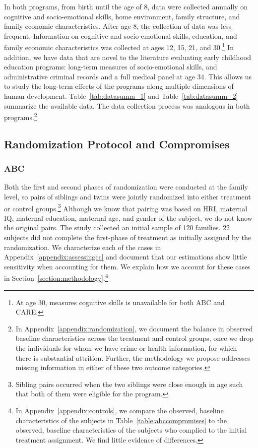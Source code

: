 \noindent In both programs, from birth until the age of 8, data were collected annually on cognitive and socio-emotional skills, home environment, family structure, and family economic characteristics. After age 8, the collection of data was less frequent. Information on cognitive and socio-emotional skills, education, and family economic characteristics was collected at ages 12, 15, 21, and 30.\footnote{At age 30, measures cognitive skills is unavailable for both ABC and CARE.} In addition, we have data that are novel to the literature evaluating early childhood education programs: long-term measures of socio-emotional skills, and administrative criminal records and a full medical panel at age 34. This allows us to study the long-term effects of the programs along multiple dimensions of human development. Table~\ref{tab:datasumm_1} and Table~\ref{tab:datasumm_2} summarize the available data. The data collection process was analogous in both programs.\footnote{In Appendix~\ref{appendix:randomization}, we document the balance in observed baseline characteristics across the treatment and control groups, once we drop the individuals for whom we have crime or health information, for which there is substantial attrition. Further, the methodology we propose addresses missing information in either of these two outcome categories.}



\subsection{Randomization Protocol and Compromises} \label{section:randomization}

\subsubsection{ABC}

\noindent Both the first and second phases of randomization were conducted at the family level, so pairs of siblings and twins were jointly randomized into either treatment or control groups.\footnote{Sibling pairs occurred when the two siblings were close enough in age such that both of them were eligible for the program.} Although we know that pairing was based on HRI, maternal IQ, maternal education, maternal age, and gender of the subject, we do not know the original pairs. The study collected an initial sample of 120 families. 22 subjects did not complete the first-phase of treatment as initially assigned by the randomization. We characterize each of the cases in Appendix~\ref{appendix:assessingcc} and document that our estimations show little sensitivity when accounting for them. We explain how we account for these cases in Section~\ref{section:methodology}.\footnote{In Appendix~\ref{appendix:controls}, we compare the observed, baseline characteristics of the subjects in Table~\ref{table:abccompromises} to the observed, baseline characteristics of the subjects who complied to the initial treatment assignment. We find little evidence of differences.}\\


